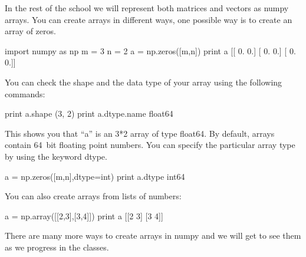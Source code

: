 \begin{exercise}
In the rest of the school we will represent both matrices and vectors as numpy arrays. You can create arrays in different ways, one possible way is to create an array of zeros.
\begin{python}
import numpy as np
m = 3
n = 2
a = np.zeros([m,n])
print a 
[[ 0.  0.]
 [ 0.  0.]
 [ 0.  0.]]
\end{python}

\noindent You can check the shape and the data type of your array using the following commands:
\begin{python}
print a.shape
(3, 2)
print a.dtype.name
float64
\end{python}
This shows you that ``a'' is an 3*2 array of type float64. By default, arrays contain 64~bit\footnotemark{} floating point numbers. You can specify the particular array type by using the keyword dtype.

\begin{python}
a = np.zeros([m,n],dtype=int)
print a.dtype
int64
\end{python}

\smallskip

\noindent You can also create arrays from lists of numbers:
\begin{python}
a = np.array([[2,3],[3,4]])
print a
[[2 3]
 [3 4]]
\end{python}

There are many more ways to create arrays in numpy and we will get to see them as we progress in the classes.

\end{exercise}


